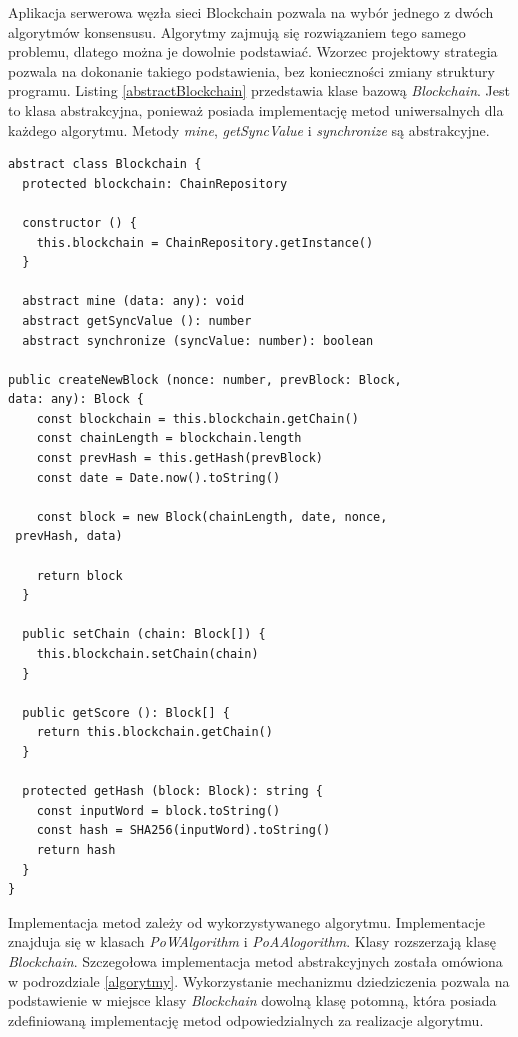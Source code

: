 \documentclass[a4paper,12pt]{book}
\begin{document}
Aplikacja serwerowa węzła sieci Blockchain pozwala na wybór jednego z dwóch algorytmów konsensusu. Algorytmy zajmują się rozwiązaniem tego samego problemu, dlatego można je dowolnie podstawiać. Wzorzec projektowy strategia pozwala na dokonanie takiego podstawienia, bez konieczności zmiany struktury programu. Listing \ref{abstractBlockchain} przedstawia klase bazową \textit{Blockchain}.
Jest to klasa abstrakcyjna, ponieważ posiada implementację metod uniwersalnych dla każdego algorytmu. Metody \textit{mine}, \textit{getSyncValue} i \textit{synchronize} są abstrakcyjne.

\begin{lstlisting}[style=ES6, caption={Klasa \textit{Blockchain}.}, label={abstractBlockchain}]
abstract class Blockchain {
  protected blockchain: ChainRepository

  constructor () {
    this.blockchain = ChainRepository.getInstance()
  }

  abstract mine (data: any): void
  abstract getSyncValue (): number
  abstract synchronize (syncValue: number): boolean

public createNewBlock (nonce: number, prevBlock: Block, 
data: any): Block {
    const blockchain = this.blockchain.getChain()
    const chainLength = blockchain.length
    const prevHash = this.getHash(prevBlock)
    const date = Date.now().toString()

    const block = new Block(chainLength, date, nonce,
 prevHash, data)

    return block
  }

  public setChain (chain: Block[]) {
    this.blockchain.setChain(chain)
  }

  public getScore (): Block[] {
    return this.blockchain.getChain()
  }

  protected getHash (block: Block): string {
    const inputWord = block.toString()
    const hash = SHA256(inputWord).toString()
    return hash
  }
}
\end{lstlisting}

Implementacja metod zależy od wykorzystywanego algorytmu. Implementacje znajduja się w klasach \textit{PoWAlgorithm} i \textit{PoAAlogorithm}. Klasy rozszerzają klasę \textit{Blockchain}.
Szczegołowa implementacja metod abstrakcyjnych została omówiona w podrozdziale \ref{algorytmy}. Wykorzystanie mechanizmu dziedziczenia pozwala na podstawienie w miejsce klasy \textit{Blockchain} dowolną klasę potomną, która posiada zdefiniowaną implementację metod odpowiedzialnych za realizacje algorytmu.
\end{document}
